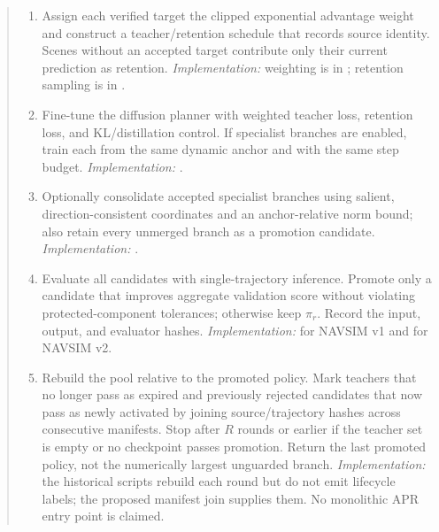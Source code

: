 \begin{quote}
\begin{enumerate}
  \item Assign each verified target the clipped exponential advantage weight
  and construct a teacher/retention schedule that records source identity.
  Scenes without
  an accepted target contribute only their current prediction as retention.
  \emph{Implementation:} weighting is in
  ;
  retention sampling is in
  .

  \item Fine-tune the diffusion planner with weighted teacher loss, retention
  loss, and KL/distillation control.  If specialist branches are enabled,
  train each from the same dynamic anchor and with the same step budget.
  \emph{Implementation:}
  .

  \item Optionally consolidate accepted specialist branches using salient,
  direction-consistent coordinates and an anchor-relative norm bound; also
  retain every unmerged branch as a promotion candidate.  \emph{Implementation:}
  .

  \item Evaluate all candidates with single-trajectory inference.  Promote
  only a candidate that improves aggregate validation score without violating
  protected-component tolerances; otherwise keep $\pi_r$.  Record the input,
  output, and evaluator hashes.  \emph{Implementation:}
  for NAVSIM v1 and
  for NAVSIM v2.

  \item Rebuild the pool relative to the promoted policy.  Mark teachers that
  no longer pass as expired and previously rejected candidates that now pass as
  newly activated by joining source/trajectory hashes across consecutive
  manifests.  Stop after $R$ rounds or earlier if the teacher set is empty
  or no checkpoint passes promotion.  Return the last promoted policy, not the
  numerically largest unguarded branch.  \emph{Implementation:} the historical
  scripts rebuild each round but do not emit lifecycle labels; the proposed
  manifest join supplies them.  No monolithic APR entry point is claimed.
\end{enumerate}
\end{quote}
